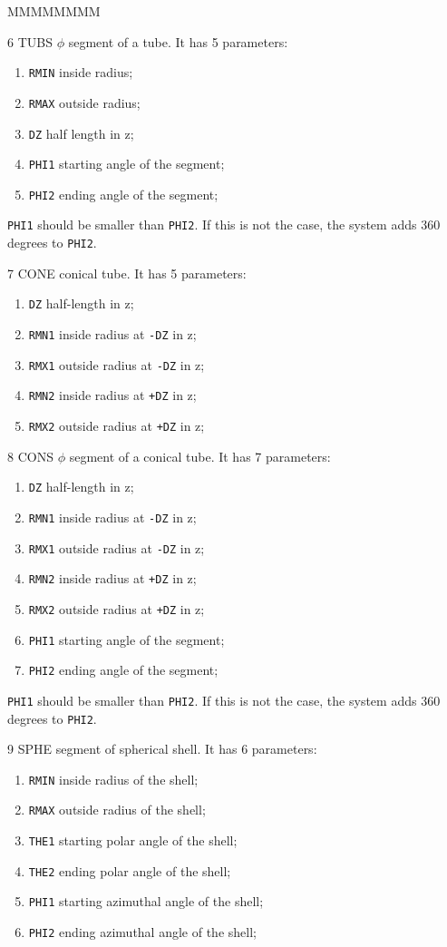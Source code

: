 \begin{DLtt}{MMMMMMMM}
\item[6  TUBS] $\phi$ segment of a tube. It has 5 parameters:
\begin{enumerate}
\item {\tt RMIN} inside radius;
\item {\tt RMAX} outside radius;
\item {\tt DZ} half length in z;
\item {\tt PHI1} starting angle of the segment;
\item {\tt PHI2} ending angle of the segment;
\end{enumerate}
{\tt PHI1} should be smaller than {\tt PHI2}. If this is not the case,
the system adds 360 degrees to {\tt PHI2}.
 
\item[7  CONE] conical tube. It has 5 parameters:
\begin{enumerate}
\item {\tt DZ} half-length in z;
\item {\tt RMN1} inside radius at {\tt -DZ} in z;
\item {\tt RMX1} outside radius at {\tt -DZ} in z;
\item {\tt RMN2} inside radius at {\tt +DZ} in z;
\item {\tt RMX2} outside radius at {\tt +DZ} in z;
\end{enumerate}

 
\item[8  CONS] $\phi$ segment of a conical tube. It has 7 parameters:
\begin{enumerate}
\item {\tt DZ} half-length in z;
\item {\tt RMN1} inside radius at {\tt -DZ} in z;
\item {\tt RMX1} outside radius at {\tt -DZ} in z;
\item {\tt RMN2} inside radius at {\tt +DZ} in z;
\item {\tt RMX2} outside radius at {\tt +DZ} in z;
\item {\tt PHI1} starting angle of the segment;
\item {\tt PHI2} ending angle of the segment;
\end{enumerate}
{\tt PHI1} should be smaller than {\tt PHI2}. If this is not the case,
the system adds 360 degrees to {\tt PHI2}.

\item[9  SPHE] segment of spherical shell. It has 6 parameters:
\begin{enumerate}
\item {\tt RMIN} inside radius of the shell;
\item {\tt RMAX} outside radius of the shell;
\item {\tt THE1} starting polar angle of the shell;
\item {\tt THE2} ending polar angle of the shell;
\item {\tt PHI1} starting azimuthal angle of the shell;
\item {\tt PHI2} ending azimuthal angle of the shell;
\end{enumerate}
 

\end{DLtt}
